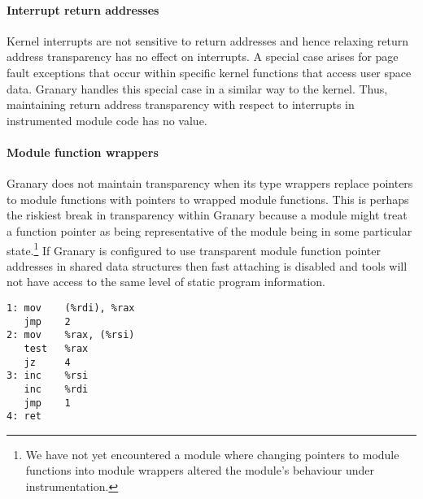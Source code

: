 \documentclass[preprint]{sigplanconf}
\begin{document}
\vspace{-3pt}\paragraph{Interrupt return addresses} Kernel interrupts are not sensitive to return addresses and hence relaxing return address transparency has no effect on interrupts. A special case arises for page fault exceptions that occur within specific kernel functions that access user space data. Granary handles this special case in a similar way to the kernel. Thus, maintaining return address transparency with respect to interrupts in instrumented module code has no value.


\vspace{-3pt}\paragraph{Module function wrappers} Granary does not maintain transparency when its type wrappers replace pointers to module functions with pointers to wrapped module functions. This is perhaps the riskiest break in transparency within Granary because a module might treat a function pointer as being representative of the module being in some particular state.\footnote{We have not yet encountered a module where changing pointers to module functions into module wrappers altered the module's behaviour under instrumentation.} If Granary is configured to use transparent module function pointer addresses in shared data structures then fast attaching is disabled and tools will not have access to the same level of static program information.


\lstset{language=[x64]Assembler}
\newsavebox\asmbox
\begin{lrbox}{\asmbox}
\begin{minipage}[b]{4cm}
\begin{lstlisting}[basicstyle=\footnotesize\ttfamily]
1: mov    (%rdi), %rax
   jmp    2
2: mov    %rax, (%rsi)
   test   %rax
   jz     4
3: inc    %rsi
   inc    %rdi
   jmp    1
4: ret
\end{lstlisting}
\end{minipage}
\end{lrbox}
\end{document}
